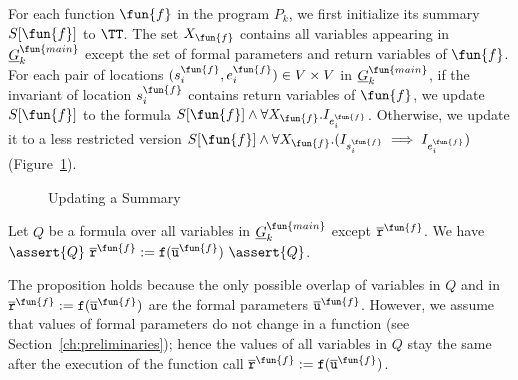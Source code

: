 For each function $\fun{f}$ in the program $P_k$, we first initialize its summary $S[\fun{f}]$ to $\TT$.
The set $X_\fun{f}$ contains all variables appearing in $\underline{G}^{\fun{main}}_k$ except the set of formal parameters and return variables of $\fun{f}$.
For each pair of locations $(s_i^\fun{f},e_i^\fun{f})\in V\times V$ in $\underline{G}^{\fun{main}}_k$, if the invariant of location $s_i^\fun{f}$ contains return variables of $\fun{f}$, we update $S[\fun{f}]$ to the formula $S[\fun{f}]\wedge \forall X_\fun{f}.I_{e_i^\fun{f}}$. Otherwise, we update it to a less restricted version $S[\fun{f}]\wedge \forall X_\fun{f}. (I_{s_i^\fun{f}} \implies I_{e_i^\fun{f}})$ (Figure~\ref{figure:updating-summary}).

\begin{figure}[t]
  \centering

  \caption{Updating a Summary}
  \label{figure:updating-summary}
\end{figure}
\begin{proposition}
\label{propposition:invariant}
Let $Q$ be a formula over all variables in $\underline{G}^{\fun{main}}_k$ except $\mathtt{\overline{r}}^\fun{f}$.
We have $\assert{Q}\
  \mathtt{\overline{r}}^\fun{f} := \mathtt{f}
  (\overline{\mathtt{u}}^\fun{f})\ \assert{Q}$.
\end{proposition}
The proposition holds because the only possible overlap of variables in $Q$ and in $\mathtt{\overline{r}}^\fun{f} := \mathtt{f} (\overline{\mathtt{u}}^\fun{f})$ are the formal parameters $\overline{\mathtt{u}}^\fun{f}$. However, we assume that values of formal parameters do not change in a function (see Section~\ref{ch:preliminaries}); hence the values of all variables in $Q$ stay the same after the execution of the function call $\mathtt{\overline{r}}^\fun{f} := \mathtt{f} (\overline{\mathtt{u}}^\fun{f})$.


